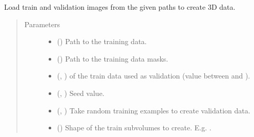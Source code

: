 \documentclass[letterpaper,10pt,english]{sphinxmanual}
\begin{document}
\begin{fulllineitems}
\label{\detokenize{data/data_3d_manipulation:data.data_3D_manipulation.load_and_prepare_3D_data}}
Load train and validation images from the given paths to create 3D data.
\begin{quote}\begin{description}
\item[{Parameters}] \leavevmode\begin{itemize}
\item {} 
 () \textendash{} Path to the training data.

\item {} 
 () \textendash{} Path to the training data masks.

\item {} 
 (, ) \textendash{} \sphinxcode{\sphinxupquote{\%}} of the train data used as validation (value between  and ).

\item {} 
 (, ) \textendash{} Seed value.

\item {} 
 (, ) \textendash{} Take random training examples to create validation data.

\item {} 
 () \textendash{} Shape of the train subvolumes to create. E.g. .


\end{itemize}
\end{description}
\end{quote}
\end{fulllineitems}
\end{document}
